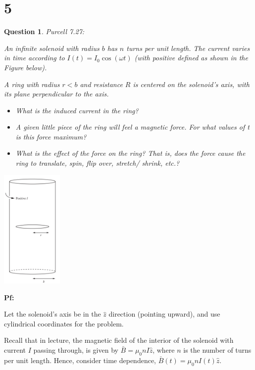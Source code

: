 \documentclass{article}
\newtheorem{question}{Question}
\begin{document}
\section*{5}
\begin{myBox}[]{}
    \begin{question}
        Purcell 7.27:

        An infinite solenoid with radius $b$ has $n$ turns per unit length. The
        current varies in time according to $I(t) = I_0\cos(\omega t)$ (with positive 
        defined as shown in the Figure below). 
        
        A ring with radius $r < b$ and resistance $R$ is centered on the solenoid’s axis, 
        with its plane perpendicular to the axis.

        \begin{itemize}
            \item[(a)] What is the induced current in the ring?
            \item[(b)] A given little piece of the ring will feel a magnetic force. For
            what values of t is this force maximum?
            \item[(c)] What is the effect of the force on the ring? That is, does the
            force cause the ring to translate, spin, flip over, stretch/
            shrink, etc.?
        \end{itemize}
    \end{question}

    \begin{center}
        \includegraphics*[width=30mm]{7.26.png}
    \end{center}
\end{myBox}

\textbf{Pf:}

Let the solenoid's axis be in the $\hat{z}$ direction (pointing upward), and use cylindrical coordinates for the problem.

Recall that in lecture, the magnetic field of the interior of the solenoid with current $I$ passing through, is given by $\bar{B}=\mu_0 nI\hat{z}$,
where $n$ is the number of turns per unit length. Hence, consider time dependence, $\bar{B}(t)=\mu_0nI(t)\hat{z}$.
\end{document}
